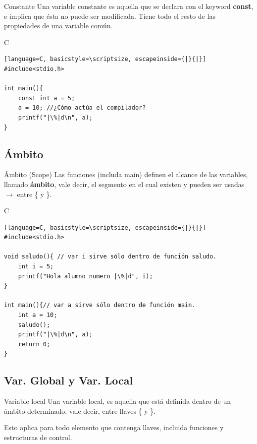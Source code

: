 \documentclass{beamer}
\begin{document}
\begin{frame}[fragile]{Constante}
Una variable constante es aquella que se declara con el keyword \textbf{const}, e implica que ésta no puede ser modificada. Tiene todo el resto de las propiedades de una variable común.

\begin{exampleblock}{C}
\begin{lstlisting}[language=C, basicstyle=\scriptsize, escapeinside={|}{|}]
#include<stdio.h>

int main(){
	const int a = 5;
	a = 10; //¿Cómo actúa el compilador?
	printf("|\%|d\n", a);
}
\end{lstlisting}\end{exampleblock}
\end{frame}

\subsection{Ámbito}


\begin{frame}[fragile]{Ámbito (Scope)}
Las funciones (includa main) definen el alcance de las variables, llamado \textbf{ámbito}, vale decir, el segmento en el cual existen y pueden ser usadas $\rightarrow$ entre \{ y \}.

\begin{exampleblock}{C}
\begin{lstlisting}[language=C, basicstyle=\scriptsize, escapeinside={|}{|}]
#include<stdio.h>

void saludo(){ // var i sirve sólo dentro de función saludo.
	int i = 5;
	printf("Hola alumno numero |\%|d", i);
}

int main(){// var a sirve sólo dentro de función main. 
	int a = 10;
	saludo();
	printf("|\%|d\n", a);
	return 0;
}
\end{lstlisting}\end{exampleblock}
\end{frame}

\subsection{Var. Global y Var. Local}

\begin{frame}[fragile]{Variable local}
Una variable local, es aquella que está definida dentro de un ámbito determinado, vale decir, entre llaves \{ y \}.\\
\bigskip

Esto aplica para todo elemento que contenga llaves, incluida funciones y estructuras de control. 
\end{frame}
\end{document}
